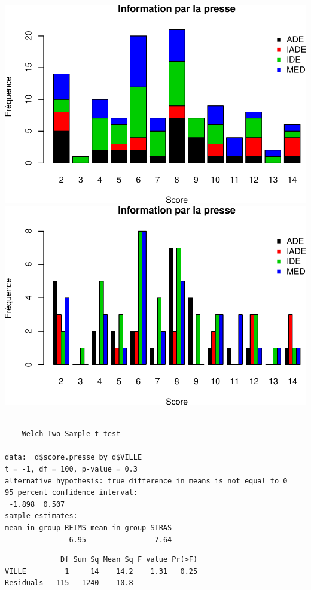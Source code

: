 \documentclass[]{article}
\begin{document}
\includegraphics{analyse_files/figure-latex/unnamed-chunk-14-5.pdf}
\includegraphics{analyse_files/figure-latex/unnamed-chunk-14-6.pdf}

\begin{verbatim}

    Welch Two Sample t-test

data:  d$score.presse by d$VILLE
t = -1, df = 100, p-value = 0.3
alternative hypothesis: true difference in means is not equal to 0
95 percent confidence interval:
 -1.898  0.507
sample estimates:
mean in group REIMS mean in group STRAS 
               6.95                7.64 
\end{verbatim}

\begin{verbatim}
             Df Sum Sq Mean Sq F value Pr(>F)
VILLE         1     14    14.2    1.31   0.25
Residuals   115   1240    10.8               
\end{verbatim}
\end{document}
